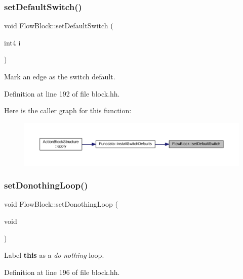 \subsubsection{\texorpdfstring{setDefaultSwitch()}{setDefaultSwitch()}}
{\footnotesize\ttfamily void Flow\+Block\+::set\+Default\+Switch (\begin{DoxyParamCaption}\item[{int4}]{i }\end{DoxyParamCaption})\hspace{0.3cm}{\ttfamily [inline]}}



Mark an edge as the switch default. 



Definition at line 192 of file block.\+hh.

Here is the caller graph for this function\+:
\nopagebreak
\begin{figure}[H]
\begin{center}
\leavevmode
\includegraphics[width=350pt]{class_flow_block_a0056fb3c60ff3449a313171dee202c76_icgraph}
\end{center}
\end{figure}
\mbox{\label{class_flow_block_abab69fbbe915213e4164f2d2af788935}} 
\subsubsection{\texorpdfstring{setDonothingLoop()}{setDonothingLoop()}}
{\footnotesize\ttfamily void Flow\+Block\+::set\+Donothing\+Loop (\begin{DoxyParamCaption}\item[{void}]{ }\end{DoxyParamCaption})\hspace{0.3cm}{\ttfamily [inline]}}



Label {\bfseries{this}} as a {\itshape do} {\itshape nothing} loop. 



Definition at line 196 of file block.\+hh.

